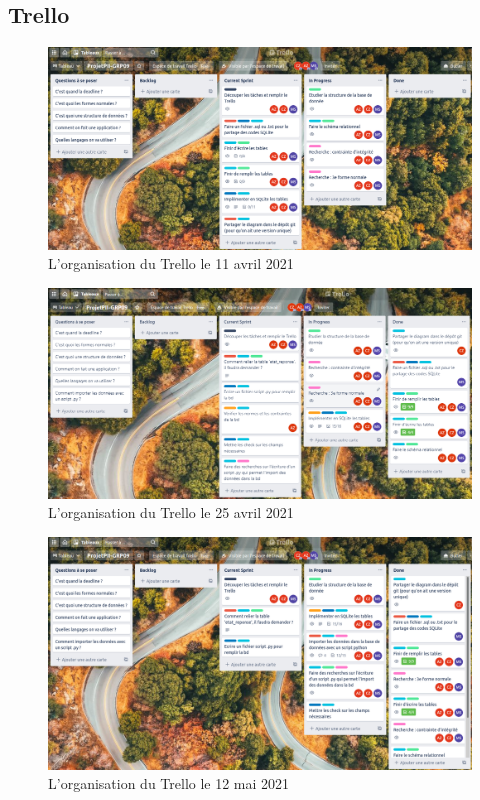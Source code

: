 \documentclass[12pt]{article}
\begin{document}
    \subsection*{Trello}
        \begin{figure}[!h]
            \centering
            \includegraphics[scale = 0.37]{Images/Gestion de Projet/Trello/Trello_11042021.png}
            \caption{L'organisation du Trello le 11 avril 2021}
            \label{fig:Trello11042021}
        \end{figure}
        \begin{figure}[!h]
            \centering
            \includegraphics[scale = 0.37]{Images/Gestion de Projet/Trello/Trello_25042021.png}
            \caption{L'organisation du Trello le 25 avril 2021}
        \label{fig:Trello25042021}
        \end{figure}
\newpage
        \begin{figure}[!h]
            \centering
            \includegraphics[scale = 0.37]{Images/Gestion de Projet/Trello/Trello_12052021.png}
            \caption{L'organisation du Trello le 12 mai 2021}
            \label{fig:Trello12052021}
        \end{figure}
\end{document}
